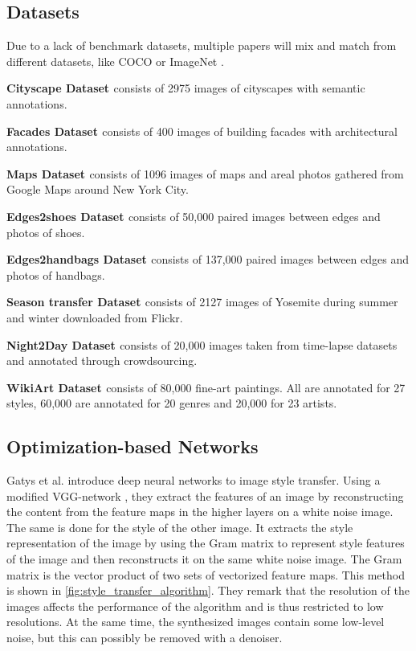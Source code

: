 \subsection{Datasets}
Due to a lack of benchmark datasets, multiple papers will mix and match from different datasets, like \gls{COCO} or ImageNet \cite{Deng2009}.

\textbf{Cityscape Dataset \cite{Cordts2016}} consists of 2975 images of cityscapes with semantic annotations.

\textbf{Facades Dataset \cite{Tylecek2013}} consists of 400 images of building facades with architectural annotations.

\textbf{Maps Dataset \cite{Isola2016}} consists of 1096 images of maps and areal photos gathered from Google Maps around New York City.

\textbf{Edges2shoes Dataset \cite{Yu2014}} consists of 50,000 paired images between edges and photos of shoes.

\textbf{Edges2handbags Dataset \cite{Zhu2016}} consists of 137,000 paired images between edges and photos of handbags.

\textbf{Season transfer Dataset \cite{Zhu2017}} consists of 2127 images of Yosemite during summer and winter downloaded from Flickr.

\textbf{Night2Day Dataset \cite{Laffont2014}} consists of 20,000 images taken from time-lapse datasets and annotated through crowdsourcing.

\textbf{WikiArt Dataset \cite{Tan2018}} consists of 80,000 fine-art paintings.
All are annotated for 27 styles, 60,000 are annotated for 20 genres and 20,000 for 23 artists.


\subsection{Optimization-based Networks}
Gatys et al. \cite{Gatys2016} introduce deep neural networks to image style transfer.
Using a modified VGG-network \cite{Simonyan2015}, they extract the features of an image by reconstructing the content from the feature maps in the higher layers on a white noise image.
The same is done for the style of the other image.
It extracts the style representation of the image by using the Gram matrix to represent style features of the image and then reconstructs it on the same white noise image.
The Gram matrix is the vector product of two sets of vectorized feature maps.
This method is shown in \ref{fig:style_transfer_algorithm}.
They remark that the resolution of the images affects the performance of the algorithm and is thus restricted to low resolutions.
At the same time, the synthesized images contain some low-level noise, but this can possibly be removed with a denoiser.

